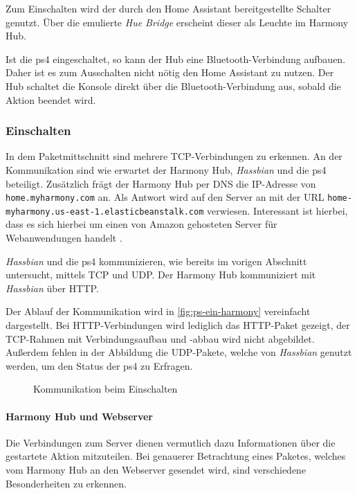 Zum Einschalten wird der durch den Home Assistant bereitgestellte Schalter genutzt.
Über die emulierte \textit{Hue Bridge} erscheint dieser als Leuchte im Harmony Hub.

Ist die \ac{ps4} eingeschaltet, so kann der Hub eine Bluetooth-Verbindung aufbauen.
Daher ist es zum Ausschalten nicht nötig den Home Assistant zu nutzen.
Der Hub schaltet die Konsole direkt über die Bluetooth-Verbindung aus,
sobald die Aktion beendet wird.

\subsubsection{Einschalten}
In dem Paketmittschnitt sind mehrere TCP-Verbindungen zu erkennen.
An der Kommunikation sind wie erwartet der Harmony Hub, \textit{Hassbian} und die \ac{ps4} beteiligt.
Zusätzlich frägt der Harmony Hub per DNS die IP-Adresse von \nolinkurl{home.myharmony.com} an.
Als Antwort wird auf den Server an mit der URL \nolinkurl{home-myharmony.us-east-1.elasticbeanstalk.com} verwiesen.
Interessant ist hierbei,
dass es sich hierbei um einen von Amazon gehosteten Server für Webanwendungen handelt \cite{AWSElast48:online}.

\textit{Hassbian} und die \ac{ps4} kommunizieren, wie bereits im vorigen Abschnitt untersucht, mittels TCP und UDP.
Der Harmony Hub kommuniziert mit \textit{Hassbian} über HTTP.

Der Ablauf der Kommunikation wird in \autoref{fig:ps-ein-harmony} vereinfacht dargestellt.
Bei HTTP-Verbindungen wird lediglich das HTTP-Paket gezeigt,
der TCP-Rahmen mit Verbindungsaufbau und -abbau wird nicht abgebildet.
Außerdem fehlen in der Abbildung die UDP-Pakete,
welche von \textit{Hassbian} genutzt werden,
um den Status der \ac{ps4} zu Erfragen.
\begin{figure}
    \centering
    \resizebox{\textwidth}{!}{
        
    }
    \caption{Kommunikation beim Einschalten}
    \label{fig:ps-ein-harmony}
\end{figure}

\newpage



\paragraph{Harmony Hub und Webserver}
Die Verbindungen zum Server dienen vermutlich dazu Informationen über die gestartete Aktion mitzuteilen.
Bei genauerer Betrachtung eines Paketes, welches vom Harmony Hub an den Webserver gesendet wird,
sind verschiedene Besonderheiten zu erkennen.

